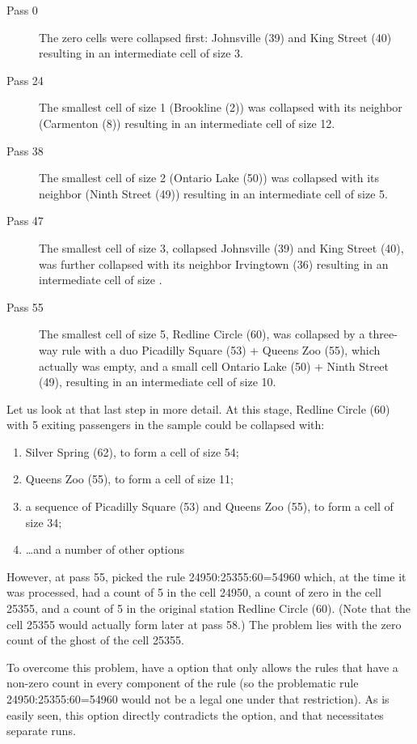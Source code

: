 \begin{description}
    \item[Pass 0] The zero cells were collapsed first: Johnsville (39) and King Street (40) resulting
        in an intermediate cell of size 3.
    \item[Pass 24] The smallest cell of size 1 (Brookline (2)) was collapsed with its neighbor
        (Carmenton (8)) resulting in an intermediate cell of size 12.
    \item[Pass 38] The smallest cell of size 2 (Ontario Lake (50)) was collapsed with its neighbor
        (Ninth Street (49)) resulting in an intermediate cell of size 5.
    \item[Pass 47] The smallest cell of size 3, collapsed Johnsville (39) and King Street (40),
        was further collapsed with its neighbor Irvingtown (36) resulting in an intermediate cell of size .
    \item[Pass 55] The smallest cell of size 5, Redline Circle (60), was collapsed by a three-way rule
        with a duo Picadilly Square (53) + Queens Zoo (55), which actually was empty, and a small cell
        Ontario Lake (50) + Ninth Street (49), resulting in an intermediate cell of size 10.
\end{description}

Let us look at that last step in more detail. At this stage, Redline Circle (60) with 5 exiting passengers in
the sample could be collapsed with:
\begin{enumerate}
    \item Silver Spring (62), to form a cell of size 54;
    \item Queens Zoo (55), to form a cell of size 11;
    \item a sequence of Picadilly Square (53) and Queens Zoo (55), to form a cell of size 34;
    \item \ldots and a number of other options
\end{enumerate}
However, at pass 55,  picked the rule 24950:25355:60=54960 which, at the time it was
processed, had a count of 5 in the cell 24950, a count of zero in the cell 25355, and a count of 5 in the
original station Redline Circle (60). (Note that the cell 25355 would actually form later at pass 58.)
The problem lies with the zero count of the ghost of the cell 25355.

To overcome this problem,  have a  option that only allows the rules
that have a non-zero count in every component of the rule (so the problematic rule 
24950:25355:60=54960 would not be a legal one under that restriction). As is easily seen, 
this option directly contradicts the  option, and that necessitates separate runs.

